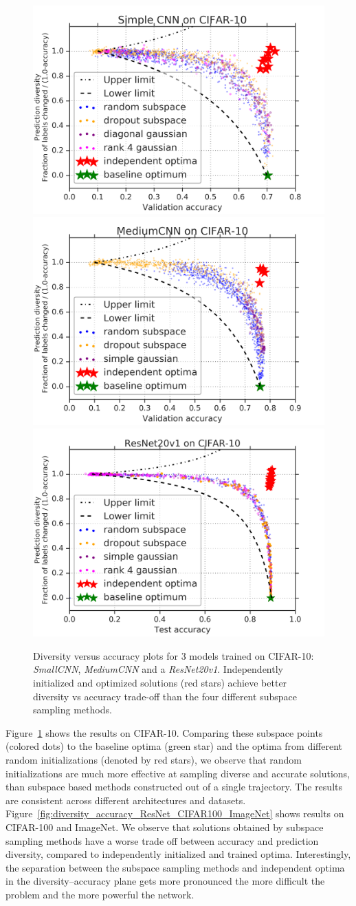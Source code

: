 \documentclass{article}
\newcommand{\reducespaceafterfigure}{\vspace{-1em}} %
\begin{document}
\begin{figure}[ht]%
    \centering%
    \includegraphics[width=0.32\linewidth]{figures/diversity_standalone_SimpleCNN_288318.png}
    \includegraphics[width=0.32\linewidth]{figures/diversity_standalone_MediumCNN_53661.png}
    \includegraphics[width=0.32\linewidth]{figures/diversity_standalone_ResNet_853679.png}
    \reducespaceafterfigure %
      \caption{
    Diversity versus accuracy plots for 3 models trained on CIFAR-10: \emph{SmallCNN}, \emph{MediumCNN} and a \emph{ResNet20v1}. Independently initialized and optimized solutions (red stars) achieve better diversity vs accuracy trade-off than the four different subspace sampling methods.
    }
    \label{fig:diversity_plots_all}%
\end{figure}



Figure~\ref{fig:diversity_plots_all} shows the results on CIFAR-10. %
Comparing these subspace points (colored dots) to the baseline optima (green star) and the optima from different random initializations (denoted by red stars), we observe that random initializations are much more effective at sampling diverse and accurate solutions, than subspace based methods constructed out of a single trajectory. The results are consistent across different architectures and datasets. Figure~\ref{fig:diversity_accuracy_ResNet_CIFAR100_ImageNet} shows results on CIFAR-100 and ImageNet. We observe that solutions obtained by subspace sampling methods have a worse trade off between accuracy and prediction diversity, 
compared to independently initialized and trained optima. Interestingly, the separation between the subspace sampling methods and independent optima in the diversity--accuracy plane gets more pronounced the more difficult the problem and the more powerful the network.    
%
\end{document}

